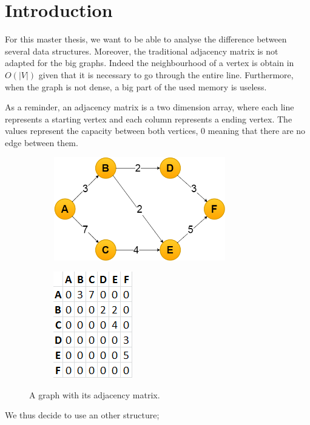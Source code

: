 \section{Introduction}
For this master thesis, we want to be able to analyse the difference between several data structures. Moreover, the traditional adjacency matrix is not adapted for the big graphs. Indeed the neighbourhood of a vertex is obtain in $O(|V|)$ given that it is necessary to go through the entire line. Furthermore, when the graph is not dense, a big part of the used memory is useless.

As a reminder, an adjacency matrix is a two dimension array, where each line represents a starting vertex and each column represents a ending vertex. The values represent the capacity between both vertices, 0 meaning that there are no edge between them. \newline

\begin{figure}[!h]
\begin{subfigure}{.6\textwidth}
\includegraphics[width=7.5cm,height=4.5cm]{images/graph.png}
\end{subfigure}
\begin{subfigure}{.4\textwidth}
\includegraphics[scale=0.7]{images/adjacencyMatrix.png}
\end{subfigure}
\caption{A graph with its adjacency matrix.}
\end{figure}

We thus decide to use an other structure; \newline

